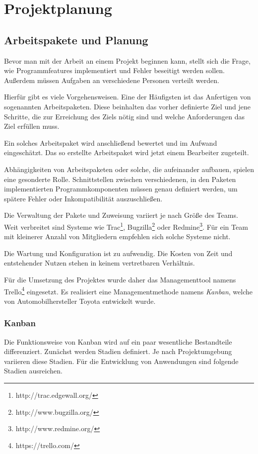\section{Projektplanung}
\label{proj}

\subsection{Arbeitspakete und Planung}
Bevor man mit der Arbeit an einem Projekt beginnen kann, stellt sich die Frage, wie Programmfeatures implementiert und Fehler beseitigt werden sollen. Außerdem müssen Aufgaben an verschiedene Personen verteilt werden.

Hierfür gibt es viele Vorgehensweisen. Eine der Häufigsten ist das Anfertigen von sogenannten Arbeitspaketen. Diese beinhalten das vorher definierte Ziel und jene Schritte, die zur Erreichung des Ziels nötig sind und welche Anforderungen das Ziel erfüllen muss.

Ein solches Arbeitspaket wird anschließend bewertet und im Aufwand eingeschätzt. Das so erstellte Arbeitspaket wird jetzt einem Bearbeiter zugeteilt.

Abhängigkeiten von Arbeitspaketen oder solche, die aufeinander aufbauen, spielen eine gesonderte Rolle. Schnittstellen zwischen verschiedenen, in den Paketen implementierten Programmkomponenten müssen genau definiert werden, um spätere Fehler oder Inkompatibilität auszuschließen.

Die Verwaltung der Pakete und Zuweisung variiert je nach Größe des Teams. Weit verbreitet sind Systeme wie Trac\footnote{http://trac.edgewall.org/}, Bugzilla\footnote{http://www.bugzilla.org/} oder Redmine\footnote{http://www.redmine.org/}. Für ein Team mit kleinerer Anzahl von Mitgliedern empfehlen sich solche Systeme nicht.

Die Wartung und Konfiguration ist zu aufwendig. Die Kosten von Zeit und entstehender Nutzen stehen in keinem vertretbaren Verhältnis.

Für die Umsetzung des Projektes wurde daher das Managementtool namens Trello\footnote{https://trello.com/} eingesetzt. Es realisiert eine Managementmethode namens \textit{Kanban}, welche von Automobilhersteller Toyota entwickelt wurde.

\subsubsection{Kanban}

Die Funktionsweise von Kanban wird auf ein paar wesentliche Bestandteile differenziert. Zunächst werden Stadien definiert. Je nach Projektumgebung variieren diese Stadien. Für die Entwicklung von Anwendungen sind folgende Stadien ausreichen. 

